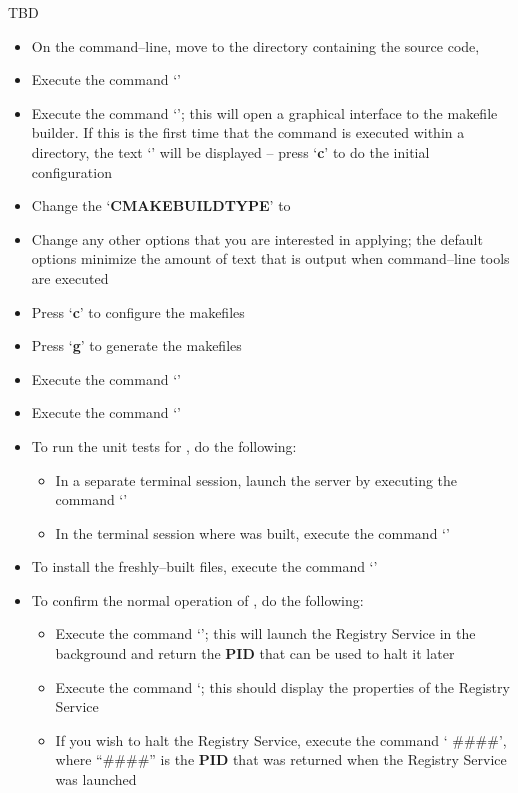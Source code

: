\tertiaryEnd{}
TBD
\tertiaryEnd{}
\secondaryEnd{}
\begin{itemize}
\item On the command--line, move to the directory containing the \mplusm{} source code,
\item Execute the command `'
\item Execute the command `'; this will open a graphical interface to the
makefile builder. If this is the first time that the command is executed within a
directory, the text `' will be displayed -- press `\textbf{c}' to do
the initial configuration
\item Change the `\textbf{CMAKE\fatUnderscore{}BUILD\fatUnderscore{}TYPE}' to
\item Change any other options that you are interested in applying; the default options
minimize the amount of text that is output when \mplusm{} command--line tools are
executed
\item Press `\textbf{c}' to configure the makefiles
\item Press `\textbf{g}' to generate the makefiles
\item Execute the command `'
\item Execute the command `'
\item To run the unit tests for \mplusm{}, do the following:
\begin{itemize}
\item In a separate terminal session, launch the \yarp{} server by executing the command
`'
\item In the terminal session where \mplusm{} was built, execute the command
`'
\end{itemize}
\item To install the freshly--built \mplusm{} files, execute the command
`'
\item To confirm the normal operation of \mplusm{}, do the following:
\begin{itemize}
\item Execute the command `'; this will launch the Registry
Service in the background and return the \textbf{PID} that can be used to halt it later
\item Execute the command `; this should display the properties
of the Registry Service
\item If you wish to halt the Registry Service, execute the command `
\#\#\#\#', where ``\#\#\#\#'' is the \textbf{PID} that was returned when the Registry
Service was launched
\end{itemize}
\end{itemize}
